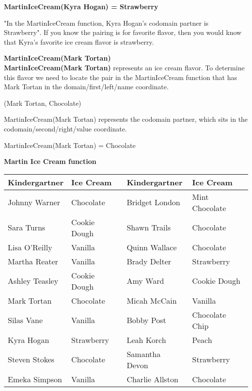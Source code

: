 \documentclass{ximera}
\begin{document}
\begin{center}
\textbf{MartinIceCream(Kyra Hogan) = Strawberry}
\end{center}

"In the MartinIceCream function, Kyra Hogan's codomain partner is  Strawberry". If you know the pairing is for favorite flavor, then you would know that Kyra's favorite ice cream flavor is strawberry.


\begin{example} \textbf{MartinIceCream(Mark Tortan)} \\
\textbf{MartinIceCream(Mark Tortan)} represents an ice cream flavor. To determine this flavor we need to locate the pair in the MartinIceCream function that has Mark Tortan in the domain/first/left/name coordinate.

\begin{center}
(Mark Tortan, Chocolate)
\end{center}

MartinIceCream(Mark Tortan) represents the codomain partner, which sits in the codomain/second/right/value coordinate.

\begin{center}
MartinIceCream(Mark Tortan) = Chocolate    
\end{center}
\end{example}



\textbf{Martin Ice Cream function} \\
\begin{center}

\begin{tabular}{|l|l|l|l|}
\hline
Kindergartner & Ice Cream & Kindergartner & Ice Cream \\\hline 
Johnny Warner & Chocolate & Bridget London & Mint Chocolate \\\hline 
Sara Turns & Cookie Dough & Shawn Trails & Chocolate \\\hline 
Lisa O'Reilly & Vanilla & Quinn Wallace & Chocolate \\\hline 
Martha Reater & Vanilla & Brady Delter & Strawberry \\\hline 
Ashley Teasley & Cookie Dough & Amy Ward & Cookie Dough \\\hline 
Mark Tortan & Chocolate & Micah McCain & Vanilla \\\hline 
Silas Vane & Vanilla & Bobby Post & Chocolate Chip \\\hline 
Kyra Hogan & Strawberry & Leah Korch & Peach \\\hline 
Steven Stokes & Chocolate & Samantha Devon & Strawberry \\\hline 
Emeka Simpson & Vanilla & Charlie Allston & Chocolate \\\hline 
\end{tabular}

\end{center}
\end{document}
